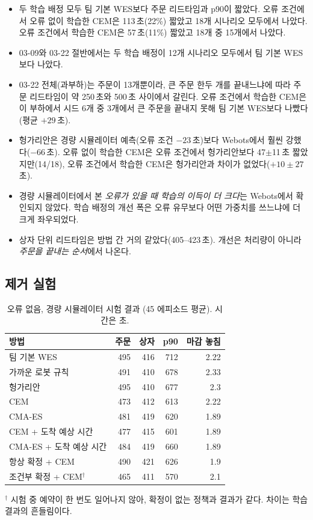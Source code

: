 \documentclass[10pt,twocolumn]{article}
\begin{document}
\begin{itemize}
  \item 두 학습 배정 모두 팀 기본 WES보다 주문 리드타임과 p90이 짧았다. 오류 조건에서 오류 없이 학습한 CEM은 113\,초(22\%) 짧았고 18개 시나리오 모두에서 나았다. 오류 조건에서 학습한 CEM은 57\,초(11\%) 짧았고 18개 중 15개에서 나았다.
  \item 03-09와 03-22 절반에서는 두 학습 배정이 12개 시나리오 모두에서 팀 기본 WES보다 나았다.
  \item 03-22 전체(과부하)는 주문이 13개뿐이라, 큰 주문 한두 개를 끝내느냐에 따라 주문 리드타임이 약 250\,초와 500\,초 사이에서 갈린다. 오류 조건에서 학습한 CEM은 이 부하에서 시드 6개 중 3개에서 큰 주문을 끝내지 못해 팀 기본 WES보다 나빴다(평균 $+29$\,초).
  \item 헝가리안은 경량 시뮬레이터 예측(오류 조건 $-23$\,초)보다 Webots에서 훨씬 강했다($-66$\,초). 오류 없이 학습한 CEM은 오류 조건에서 헝가리안보다 47$\pm$11\,초 짧았지만(14/18), 오류 조건에서 학습한 CEM은 헝가리안과 차이가 없었다($+10\pm27$\,초).
  \item 경량 시뮬레이터에서 본 \emph{오류가 있을 때 학습의 이득이 더 크다}는 Webots에서 확인되지 않았다. 학습 배정의 개선 폭은 오류 유무보다 어떤 가중치를 쓰느냐에 더 크게 좌우되었다.
  \item 상자 단위 리드타임은 방법 간 거의 같았다(405--423\,초). 개선은 처리량이 아니라 \emph{주문을 끝내는 순서}에서 나온다.
\end{itemize}

\subsection{제거 실험}

\begin{table}[t]
\centering
\caption{오류 없음, 경량 시뮬레이터 시험 결과 (45 에피소드 평균). 시간은 초.} %
\label{tab:nofault}
\small
\begin{tabular}{lrrrr}
\toprule
방법 & 주문 & 상자 & p90 & 마감 놓침 \\
\midrule
팀 기본 WES & 495 & 416 & 712 & 2.22 \\
가까운 로봇 규칙 & 491 & 410 & 678 & 2.33 \\
헝가리안 & 495 & 410 & 677 & 2.3 \\ %
CEM & 473 & 412 & 613 & 2.22 \\
\midrule
CMA-ES & 481 & 419 & 620 & 1.89 \\
CEM + 도착 예상 시간 & 477 & 415 & 601 & 1.89 \\
CMA-ES + 도착 예상 시간 & 484 & 419 & 660 & 1.89 \\
항상 확정 + CEM & 490 & 421 & 626 & 1.9 \\
조건부 확정 + CEM$^\dagger$ & 465 & 411 & 570 & 2.1 \\
\bottomrule
\end{tabular}

\vspace{2pt}
\footnotesize $^\dagger$ 시험 중 예약이 한 번도 일어나지 않아, 확정이 없는 정책과 결과가 같다. 차이는 학습 결과의 흔들림이다.
\end{table}
\end{document}

